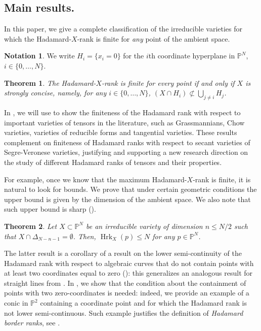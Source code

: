 \documentclass{amsart}
\theoremstyle{plain}
\numberwithin{theorem}{section}
\newtheorem{maintheorem}{Theorem}
\theoremstyle{definition}
\newtheorem*{notation}{Notation}
\newcommand{\bbP}{\mathbb{P}}
\newcommand{\Hrk}{\operatorname{Hrk}}
\begin{document}
\subsection*{Main results.}
In this paper, we give a complete classification of the irreducible varieties for which the Hadamard-$X$-rank is finite for \textit{any} point of the ambient space.

\begin{notation}
    We write $H_i = \{ x_i = 0 \}$ for the $i$th coordinate hyperplane in $\bbP^N$, $i \in \{0,\ldots,N\}$.
\end{notation}

\begin{maintheorem}
\label{thm:maximum_finite}
    The Hadamard-$X$-rank is finite for every point if and only if $X$ is strongly concise, namely, for any $i \in \{0,\ldots,N\}$, $(X \cap H_i) \not\subset \bigcup_{j\neq i} H_j$.
\end{maintheorem}

In , we will use  to show the finiteness of the Hadamard rank with respect to important varieties of tensors in the literature, such as Grassmannians, Chow varieties, varieties of reducible forms and tangential varieties. These results complement \cite[Corollary 3.9]{hadamardranks} on finiteness of Hadamard ranks with respect to secant varieties of Segre-Veronese varieties, justifying and supporting a new research direction on the study of different Hadamard ranks of tensors and their properties. 

For example, once we know that the maximum Hadamard-$X$-rank is finite, it is natural to look for bounds. We prove that under certain geometric conditions the upper bound is given by the dimension of the ambient space. We also note that such upper bound is sharp ().

\begin{maintheorem}
\label{thm:maximum_notmanyzeroes}
    Let $X \subset \bbP^N$ be an irreducible variety of dimension $n\leq N/2$ such that $X \cap \Delta_{N-n-1} = \emptyset$. Then, $\Hrk_X(p) \leq N$ for any $p\in \bbP^N$.
\end{maintheorem}
The latter result is a corollary of a result on the lower semi-continuity of the Hadamard rank with respect to algebraic curves that do not contain points with at least two coordinates equal to zero (): this generalizes an analogous result for straight lines from \cite{bocci2016hadamard}. In , we show that the condition about the containment of points with two zero-coordinates is needed: indeed, we provide an example of a conic in $\bbP^2$ containing a coordinate point and for which the Hadamard rank is not lower semi-continuous. Such example justifies the definition of \textit{Hadamard border ranks}, see .
\end{document}
